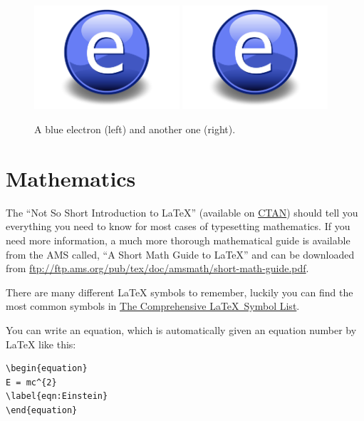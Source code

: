 \begin{figure}[t]
\centering
\includegraphics[width=0.48\textwidth]{Figures/Electron}%
\hspace{\fill}%
\includegraphics[width=0.48\textwidth]{Figures/Electron}
\decoRule
\caption{A blue electron (left) and another one (right).}
\label{fig:sidebyside}
\end{figure}

\section{Mathematics}

The \enquote{Not So Short Introduction to \LaTeX} (available on \href{http://www.ctan.org/tex-archive/info/lshort/english/lshort.pdf}{CTAN}) should tell you everything you need to know for most cases of typesetting mathematics. If you need more information, a much more thorough mathematical guide is available from the AMS called, \enquote{A Short Math Guide to \LaTeX} and can be downloaded from
\url{ftp://ftp.ams.org/pub/tex/doc/amsmath/short-math-guide.pdf}.

There are many different LaTeX symbols to remember, luckily you can find the most common symbols in \href{http://ctan.org/pkg/comprehensive}{The Comprehensive \LaTeX~Symbol List}.

You can write an equation, which is automatically given an equation number by LaTeX like this:
\begin{lstlisting}[language={[LaTeX]TeX}]
\begin{equation}
E = mc^{2}
\label{eqn:Einstein}
\end{equation}
\end{lstlisting}

